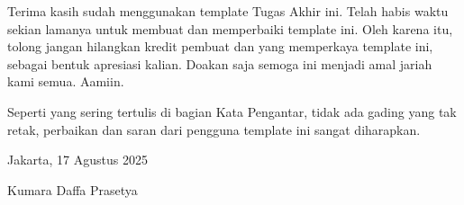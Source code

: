 Terima kasih sudah menggunakan template Tugas Akhir ini. Telah habis waktu sekian lamanya untuk membuat dan memperbaiki template ini. Oleh karena itu, tolong jangan hilangkan kredit pembuat dan yang memperkaya template ini, sebagai bentuk apresiasi kalian. Doakan saja semoga ini menjadi amal jariah kami semua. Aamiin.

Seperti yang sering tertulis di bagian Kata Pengantar, tidak ada gading yang tak retak, perbaikan dan saran dari pengguna template ini sangat diharapkan.

	\vskip 3cm
	\hspace{10cm} Jakarta, 17 Agustus 2025 \par
	\vskip 3cm
	\hspace{10cm} Kumara Daffa Prasetya